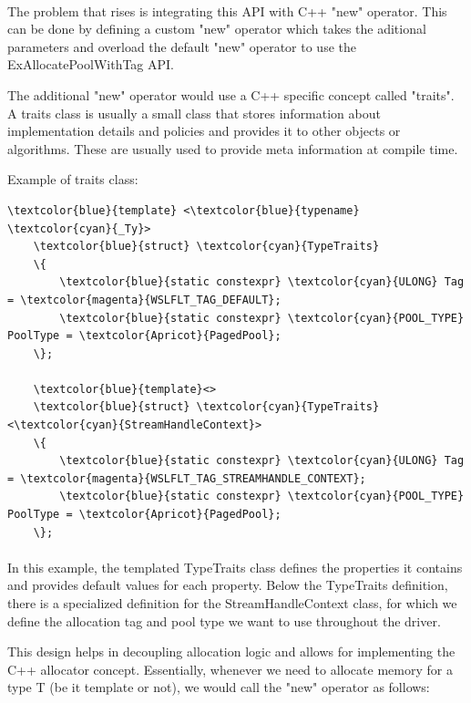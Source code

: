         \paragraph{}
        The problem that rises is integrating this API with C++ "new" operator. This can be done by defining a custom "new" operator which takes
        the aditional parameters and overload the default "new" operator to use the ExAllocatePoolWithTag API.

        The additional "new" operator would use a C++ specific concept called "traits"\cite{EffectiveModernCpp}. A traits class is usually a small
        class that stores information about implementation details and policies and provides it to other objects or algorithms. These are usually
        used to provide meta information at compile time.

        Example of traits class:
\begin{Verbatim}[fontsize=\small, commandchars=\\\{\}]
    \textcolor{blue}{template} <\textcolor{blue}{typename} \textcolor{cyan}{_Ty}>
    \textcolor{blue}{struct} \textcolor{cyan}{TypeTraits}
    \{
        \textcolor{blue}{static constexpr} \textcolor{cyan}{ULONG} Tag = \textcolor{magenta}{WSLFLT_TAG_DEFAULT};
        \textcolor{blue}{static constexpr} \textcolor{cyan}{POOL_TYPE} PoolType = \textcolor{Apricot}{PagedPool};
    \};

    \textcolor{blue}{template}<>
    \textcolor{blue}{struct} \textcolor{cyan}{TypeTraits}<\textcolor{cyan}{StreamHandleContext}>
    \{
        \textcolor{blue}{static constexpr} \textcolor{cyan}{ULONG} Tag = \textcolor{magenta}{WSLFLT_TAG_STREAMHANDLE_CONTEXT};
        \textcolor{blue}{static constexpr} \textcolor{cyan}{POOL_TYPE} PoolType = \textcolor{Apricot}{PagedPool};
    \};
\end{Verbatim}

    \paragraph{}
    In this example, the templated TypeTraits class defines the properties it contains and provides default values for each property. Below the
    TypeTraits definition, there is a specialized definition for the StreamHandleContext class, for which we define the allocation tag and
    pool type we want to use throughout the driver.

    This design helps in decoupling allocation logic and allows for implementing the C++ allocator concept. Essentially, whenever we need to
    allocate memory for a type T (be it template or not), we would call the "new" operator as follows:

